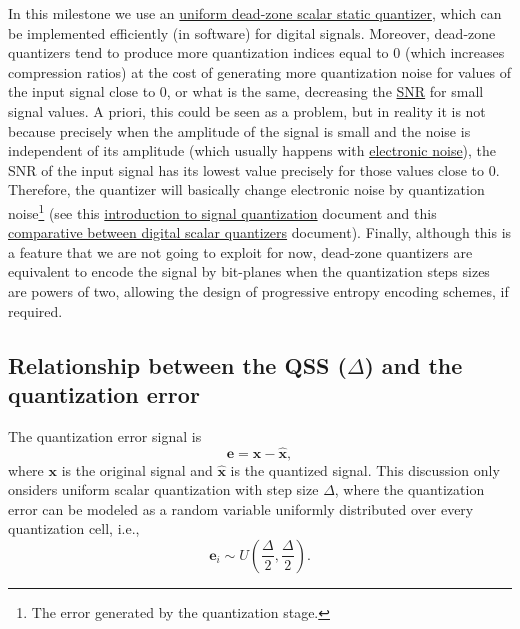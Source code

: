 In this milestone we use an
\href{https://en.wikipedia.org/wiki/Quantization_(signal_processing)#Dead-zone_quantizers}{uniform
  dead-zone scalar static quantizer}, which can be implemented
efficiently (in software) for digital signals. Moreover, dead-zone
quantizers tend to produce more quantization indices equal to 0 (which
increases compression ratios) at the cost of generating more
quantization noise for values of the input signal close to 0, or what
is the same, decreasing the
\href{https://en.wikipedia.org/wiki/Signal-to-noise_ratio}{SNR} for
small signal values. A priori, this could be seen as a problem, but in
reality it is not because precisely when the amplitude of the signal
is small and the noise is independent of its amplitude (which usually
happens with
\href{https://en.wikipedia.org/wiki/Noise_(electronics)}{electronic
  noise}), the SNR of the input signal has its lowest value precisely
for those values close to 0. Therefore, the quantizer will basically
change electronic noise by quantization noise\footnote{The error
  generated by the quantization stage.} (see this
\href{https://github.com/vicente-gonzalez-ruiz/signal_quantization}{introduction
  to signal quantization} document and this
\href{https://github.com/vicente-gonzalez-ruiz/scalar_quantization}{comparative
  between digital scalar quantizers} document). Finally, although this
is a feature that we are not going to exploit for now, dead-zone
quantizers are equivalent to encode the signal by bit-planes when the
quantization steps sizes are powers of two, allowing the design of
progressive entropy encoding schemes, if required.

\subsection{Relationship between the QSS ($\Delta$) and the quantization error}

The quantization error signal is
\begin{equation}
  \mathbf{e}=\mathbf{x}-\mathbf{\hat{x}},
\end{equation}
where $\mathbf{x}$ is the original signal and $\mathbf{\hat{x}}$ is
the quantized signal. This discussion only onsiders uniform scalar
quantization with step size $\Delta$, where the quantization error can
be modeled as a random variable uniformly distributed over every
quantization cell, i.e.,
\begin{equation}
  \mathbf{e}_i \sim U(\frac{\Delta}{2},\frac{\Delta}{2}). 
\end{equation}

